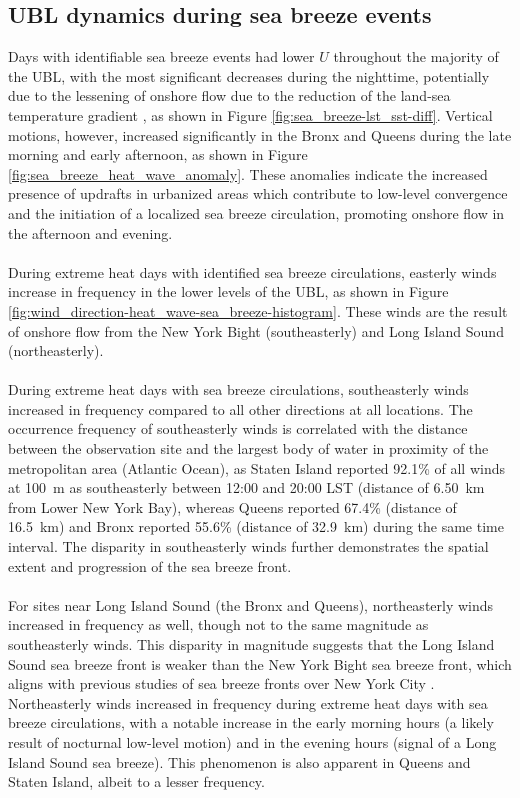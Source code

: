 \subsection{UBL dynamics during sea breeze events}
Days with identifiable sea breeze events had lower $U$ throughout the majority of the UBL, with the most significant decreases during the nighttime, potentially due to the lessening of onshore flow due to the reduction of the land-sea temperature gradient \citep{pullen2007}, as shown in Figure \ref{fig:sea_breeze-lst_sst-diff}. Vertical motions, however, increased significantly in the Bronx and Queens during the late morning and early afternoon, as shown in Figure \ref{fig:sea_breeze_heat_wave_anomaly}. These anomalies indicate the increased presence of updrafts in urbanized areas which contribute to low-level convergence and the initiation of a localized sea breeze circulation, promoting onshore flow in the afternoon and evening.
\\ \\
During extreme heat days with identified sea breeze circulations, easterly winds increase in frequency in the lower levels of the UBL, as shown in Figure \ref{fig:wind_direction-heat_wave-sea_breeze-histogram}. These winds are the result of onshore flow from the New York Bight (southeasterly) and Long Island Sound (northeasterly). 
\\ \\
During extreme heat days with sea breeze circulations, southeasterly winds increased in frequency compared to all other directions at all locations. The occurrence frequency of southeasterly winds is correlated with the distance between the observation site and the largest body of water in proximity of the metropolitan area (Atlantic Ocean), as Staten Island reported 92.1\% of all winds at \SI{100}{\meter} as southeasterly between 12:00 and 20:00 LST (distance of \SI{6.50}{\kilo\meter} from Lower New York Bay), whereas Queens reported 67.4\% (distance of \SI{16.5}{\kilo\meter}) and Bronx reported 55.6\% (distance of \SI{32.9}{\kilo\meter}) during the same time interval. The disparity in southeasterly winds further demonstrates the spatial extent and progression of the sea breeze front.
\\ \\
For sites near Long Island Sound (the Bronx and Queens), northeasterly winds increased in frequency as well, though not to the same magnitude as southeasterly winds. This disparity in magnitude suggests that the Long Island Sound sea breeze front is weaker than the New York Bight sea breeze front, which aligns with previous studies of sea breeze fronts over New York City \citep{frizzola1963, meir2013}. Northeasterly winds increased in frequency during extreme heat days with sea breeze circulations, with a notable increase in the early morning hours (a likely result of nocturnal low-level motion) and in the evening hours (signal of a Long Island Sound sea breeze). This phenomenon is also apparent in Queens and Staten Island, albeit to a lesser frequency. 

